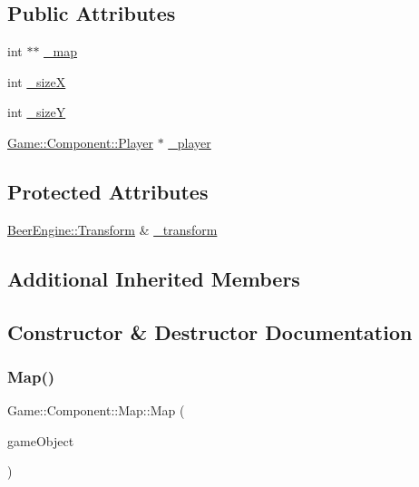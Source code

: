 \subsection*{Public Attributes}
\begin{DoxyCompactItemize}
\item 
int $\ast$$\ast$ \mbox{\hyperlink{class_game_1_1_component_1_1_map_abf30ae805d38999899c93e65227bf32d}{\+\_\+map}}
\item 
int \mbox{\hyperlink{class_game_1_1_component_1_1_map_af11ce6d26c4abbdf935e953083ee0f8b}{\+\_\+sizeX}}
\item 
int \mbox{\hyperlink{class_game_1_1_component_1_1_map_a723aed0311377486a73e7828ca91dddf}{\+\_\+sizeY}}
\item 
\mbox{\hyperlink{class_game_1_1_component_1_1_player}{Game\+::\+Component\+::\+Player}} $\ast$ \mbox{\hyperlink{class_game_1_1_component_1_1_map_a4f9d90187680d88e8e8c3f1496e70eb5}{\+\_\+player}}
\end{DoxyCompactItemize}
\subsection*{Protected Attributes}
\begin{DoxyCompactItemize}
\item 
\mbox{\hyperlink{class_beer_engine_1_1_transform}{Beer\+Engine\+::\+Transform}} \& \mbox{\hyperlink{class_game_1_1_component_1_1_map_a6e39d4388ddedb36803dd483ec22acda}{\+\_\+transform}}
\end{DoxyCompactItemize}
\subsection*{Additional Inherited Members}


\subsection{Constructor \& Destructor Documentation}
\mbox{\label{class_game_1_1_component_1_1_map_acf6edbdd27dc4bc20c47718bcdf9cb3d}} 
\subsubsection{\texorpdfstring{Map()}{Map()}}
{\footnotesize\ttfamily Game\+::\+Component\+::\+Map\+::\+Map (\begin{DoxyParamCaption}\item[{\mbox{\hyperlink{class_beer_engine_1_1_game_object}{Beer\+Engine\+::\+Game\+Object}} $\ast$}]{game\+Object }\end{DoxyParamCaption})}

